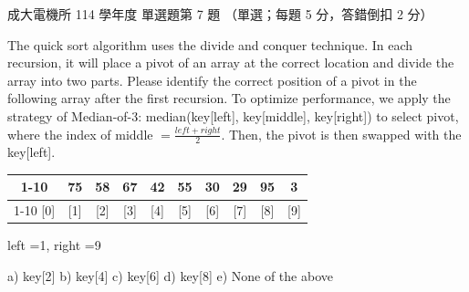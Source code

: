 \begin{pastexam}[label={px:ncku-114-ee-ds-07}]{成大電機所 114 學年度 單選題第 7 題}
（單選；每題 5 分，答錯倒扣 2 分）

The quick sort algorithm uses the divide and conquer technique. In each recursion, it will place a
pivot of an array at the correct location and divide the array into two parts. Please identify
the correct position of a pivot in the following array after the first recursion. To optimize
performance, we apply the strategy of Median-of-3: median(key[left], key[middle], key[right]) to
select pivot, where the index of middle $=\frac{left+right}{2}$. Then, the pivot is then swapped
with the key[left].

\begin{center}
\begin{tabular}{*{10}{c}}
\cline{1-10}
\multicolumn{1}{|c|}{-} & \multicolumn{1}{c|}{75} & \multicolumn{1}{c|}{58} & \multicolumn{1}{c|}{67} & \multicolumn{1}{c|}{42} & \multicolumn{1}{c|}{55} & \multicolumn{1}{c|}{30} & \multicolumn{1}{c|}{29} & \multicolumn{1}{c|}{95} & \multicolumn{1}{c|}{3}\\
\cline{1-10}
[0] & [1] & [2] & [3] & [4] & [5] & [6] & [7] & [8] & [9]
\end{tabular}
\qquad left =1, right =9
\end{center}

a) key[2] \quad b) key[4] \quad c) key[6] \quad d) key[8] \quad e) None of the above
\end{pastexam}

